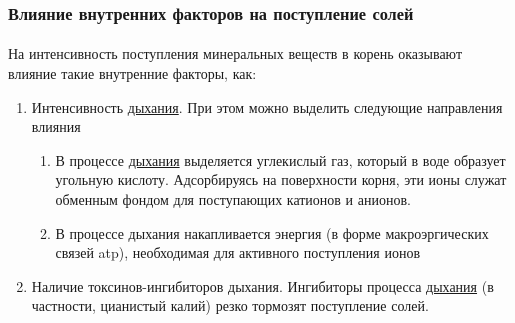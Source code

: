 
\subsubsection*{Влияние внутренних факторов на поступление солей} 

\paragraph*{}На интенсивность поступления минеральных веществ в корень оказывают влияние такие внутренние факторы, как:

\begin{enumerate}
	\item Интенсивность \hyperlink{sect_breazing}{дыхания}. При этом можно выделить следующие направления влияния
	\begin{enumerate}
		\item В процессе \hyperlink{sect_breazing}{дыхания} выделяется углекислый газ, который в воде образует угольную кислоту. Адсорбируясь на поверхности корня, эти ионы служат обменным фондом для поступающих катионов и анионов.
		\item В процессе дыхания накапливается энергия (в форме макроэргических связей \gls{atp}), необходимая для активного поступления ионов
	\end{enumerate}	
	\item Наличие токсинов-ингибиторов дыхания. Ингибиторы процесса \hyperlink{sect_breazing}{дыхания} (в частности, цианистый калий) резко тормозят поступление солей. 
	
\end{enumerate}






